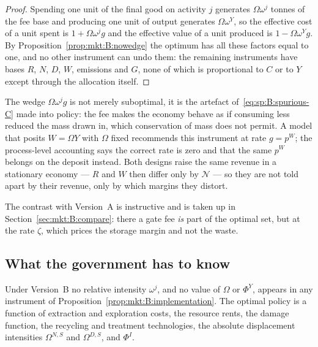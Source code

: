 \begin{proof}
Spending one unit of the final good on activity $j$ generates $\Omega\omega^j$ tonnes of the fee base
and producing one unit of output generates $\Omega\omega^Y$, so the effective cost of a unit spent is
$1+\Omega\omega^jg$ and the effective value of a unit produced is $1-\Omega\omega^Yg$. By
Proposition~\ref{prop:mkt:B:nowedge} the optimum has all these factors equal to one, and no other
instrument can undo them: the remaining instruments have bases $R$, $N$, $D$, $W$, emissions and $G$,
none of which is proportional to $C$ or to $Y$ except through the allocation itself.
\end{proof}

The wedge $\Omega\omega^jg$ is not merely suboptimal, it is the artefact of~\eqref{eq:sp:B:spurious-C}
made into policy: the fee makes the economy behave as if consuming less reduced the mass drawn in,
which conservation of mass does not permit. A model that posits $W=\Omega Y$ with $\Omega$ fixed
recommends this instrument at rate $g=p^W$; the process-level accounting says the correct rate is zero
and that the same $p^W$ belongs on the deposit instead. Both designs raise the same revenue in a
stationary economy --- $R$ and $W$ then differ only by $\mathcal N$ --- so they are not told apart by
their revenue, only by which margins they distort.

The contrast with Version~A is instructive and is taken up in Section~\ref{sec:mkt:B:compare}: there a
gate fee \emph{is} part of the optimal set, but at the rate $\zeta$, which prices the storage margin
and not the waste.


\subsection{What the government has to know}\label{sec:mkt:B:information}

\begin{proposition}
\label{prop:mkt:B:information}
Under Version~B no relative intensity $\omega^j$, and no value of $\Omega$ or $\Phi^Y$, appears in any
instrument of Proposition~\ref{prop:mkt:B:implementation}. The optimal policy is a function of
extraction and exploration costs, the resource rents, the damage function, the recycling and treatment
technologies, the absolute displacement intensities $\Omega^{N,S}$ and $\Omega^{D,S}$, and $\Phi^I$.
\end{proposition}

